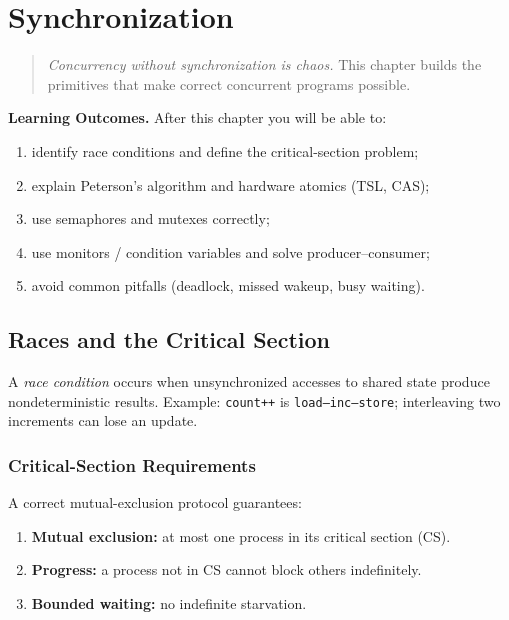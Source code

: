 \chapter{Synchronization}
\label{ch:sync}

\begin{quote}
\emph{Concurrency without synchronization is chaos.} This chapter builds the
primitives that make correct concurrent programs possible.
\end{quote}

\noindent\textbf{Learning Outcomes.} After this chapter you will be able to:
\begin{enumerate}[label=(L\arabic*)]
  \item identify race conditions and define the critical-section problem;
  \item explain Peterson's algorithm and hardware atomics (TSL, CAS);
  \item use semaphores and mutexes correctly;
  \item use monitors / condition variables and solve producer--consumer;
  \item avoid common pitfalls (deadlock, missed wakeup, busy waiting).
\end{enumerate}

\section{Races and the Critical Section}
\label{sec:race-cs}

A \emph{race condition} occurs when unsynchronized accesses to shared state
produce nondeterministic results. Example: \texttt{count++} is
\texttt{load--inc--store}; interleaving two increments can lose an update.

\subsection{Critical-Section Requirements}
A correct mutual-exclusion protocol guarantees:
\begin{enumerate}[label=(\roman*)]
  \item \textbf{Mutual exclusion:} at most one process in its critical section (CS).
  \item \textbf{Progress:} a process not in CS cannot block others indefinitely.
  \item \textbf{Bounded waiting:} no indefinite starvation.
\end{enumerate}

